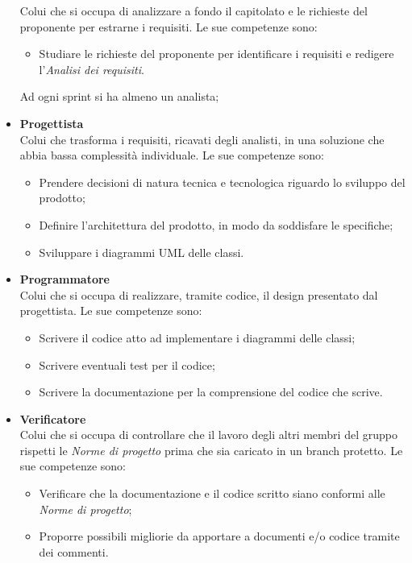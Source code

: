\begin{itemize}
          Colui che si occupa di analizzare a fondo il capitolato e le richieste del proponente per estrarne i requisiti.
          Le sue competenze sono:
          \begin{itemize}
              \item Studiare le richieste del proponente per identificare i requisiti e redigere
                    l'\textit{Analisi dei requisiti}.
          \end{itemize}
          Ad ogni sprint si ha almeno un analista;
    \item \textbf{Progettista}\\
          Colui che trasforma i requisiti, ricavati degli analisti, in una soluzione che abbia bassa complessità individuale.
          Le sue competenze sono:
          \begin{itemize}
              \item Prendere decisioni di natura tecnica e tecnologica riguardo lo sviluppo del
                    prodotto;
              \item Definire l'architettura del prodotto, in modo da soddisfare le specifiche;
              \item Sviluppare i diagrammi UML delle classi.
          \end{itemize}
    \item \textbf{Programmatore}\\
          Colui che si occupa di realizzare, tramite codice, il design presentato dal progettista.
          Le sue competenze sono:
          \begin{itemize}
              \item Scrivere il codice atto ad implementare i diagrammi delle classi;
              \item Scrivere eventuali test per il codice;
              \item Scrivere la documentazione per la comprensione del codice che scrive.
          \end{itemize}
    \item \textbf{Verificatore}\\
          Colui che si occupa di controllare che il lavoro degli altri membri del gruppo rispetti le \textit{Norme di progetto}
          prima che sia caricato in un branch protetto.
          Le sue competenze sono:
          \begin{itemize}
              \item Verificare che la documentazione e il codice scritto siano conformi alle
                    \textit{Norme di progetto};
              \item Proporre possibili migliorie da apportare a documenti e/o codice tramite dei
                    commenti.
          \end{itemize}
\end{itemize}

